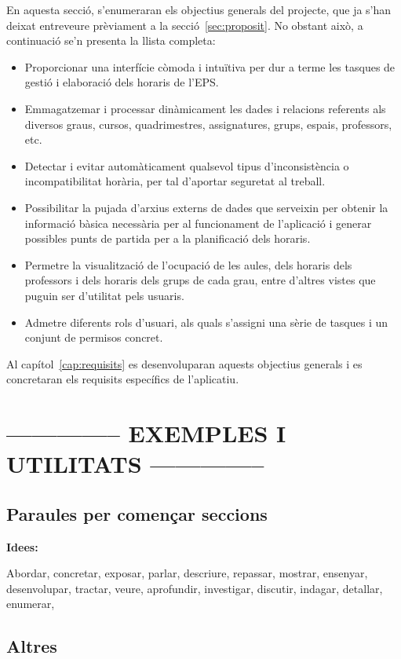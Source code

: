 \documentclass[a4paper,12pt]{ThesisStyle}
\begin{document}
En aquesta secció, s'enumeraran els objectius generals del projecte, que ja s'han deixat entreveure prèviament a la secció~\ref{sec:proposit}. No obstant això, a continuació se'n presenta la llista completa:
\begin{itemize}
  \item Proporcionar una interfície còmoda i intuïtiva per dur a terme les tasques de gestió i elaboració dels horaris de l'EPS.
  \item Emmagatzemar i processar dinàmicament les dades i relacions referents als diversos graus, cursos, quadrimestres, assignatures, grups, espais, professors, etc.
  \item Detectar i evitar automàticament qualsevol tipus d'inconsistència o incompatibilitat horària, per tal d'aportar seguretat al treball.
  \item Possibilitar la pujada d'arxius externs de dades que serveixin per obtenir la informació bàsica necessària per al funcionament de l'aplicació i generar possibles punts de partida per a la planificació dels horaris.
  \item Permetre la visualització de l'ocupació de les aules, dels horaris dels professors i dels horaris dels grups de cada grau, entre d'altres vistes que puguin ser d'utilitat pels usuaris.
  \item Admetre diferents rols d'usuari, als quals s'assigni una sèrie de tasques i un conjunt de permisos concret.
\end{itemize}

Al capítol~\ref{cap:requisits} es desenvoluparan aquests objectius generals i es concretaran els requisits específics de l'aplicatiu.


\section{-------------- EXEMPLES I UTILITATS --------------}
\subsection{Paraules per començar seccions}
\textbf{Idees:}

Abordar, concretar, exposar, parlar, descriure, repassar, mostrar, ensenyar, desenvolupar, tractar, veure, aprofundir, investigar, discutir, indagar, detallar,
enumerar,


\subsection{Altres}
\end{document}
